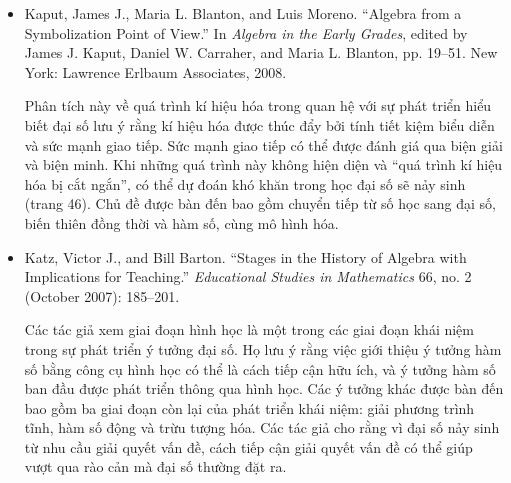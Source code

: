 {{\begin{itemize}
          \par\noindent\hspace*{1em} Saul xác định ba cấp độ trong việc học đại số: khái quát hóa số học, chú ý đến phép toán hai ngôi, và nhận diện dạng đại số, trong đó học sinh có thể quan niệm biến là đại diện cho các biểu thức đại số phức tạp. Học sinh có sự hiểu chưa đầy đủ sẽ bám vào quy tắc ghi nhớ. Việc loại bỏ khả năng thử và sai có thể buộc học sinh tập trung vào các phép toán liên quan trong bài toán đại số và đưa các em từ cấp độ thứ nhất của sự hiểu sang cấp độ thứ hai.\vspace{1.35\baselineskip}
        
        \item Kaput, James J., Maria L. Blanton, and Luis Moreno. ``Algebra from a Symbolization Point of View.'' In \emph{Algebra in the Early Grades}, edited by James J. Kaput, Daniel W. Carraher, and Maria L. Blanton, pp. 19--51. New York: Lawrence Erlbaum Associates, 2008.\vspace{.25\baselineskip}

          \par\noindent\hspace*{1em} Phân tích này về quá trình kí hiệu hóa trong quan hệ với sự phát triển hiểu biết đại số lưu ý rằng kí hiệu hóa được thúc đẩy bởi tính tiết kiệm biểu diễn và sức mạnh giao tiếp. Sức mạnh giao tiếp có thể được đánh giá qua biện giải và biện minh. Khi những quá trình này không hiện diện và ``quá trình kí hiệu hóa bị cắt ngắn'', có thể dự đoán khó khăn trong học đại số sẽ nảy sinh (trang 46). Chủ đề được bàn đến bao gồm chuyển tiếp từ số học sang đại số, biến thiên đồng thời và hàm số, cùng mô hình hóa.\vspace*{1.35\baselineskip}

        \item Katz, Victor J., and Bill Barton. ``Stages in the History of Algebra with Implications for Teaching.'' \emph{Educational Studies in Mathematics} 66, no. 2 (October 2007): 185--201.\vspace{.25\baselineskip}

          \par\noindent\hspace*{1em} Các tác giả xem giai đoạn hình học là một trong các giai đoạn khái niệm trong sự phát triển ý tưởng đại số. Họ lưu ý rằng việc giới thiệu ý tưởng hàm số bằng công cụ hình học có thể là cách tiếp cận hữu ích, và ý tưởng hàm số ban đầu được phát triển thông qua hình học. Các ý tưởng khác được bàn đến bao gồm ba giai đoạn còn lại của phát triển khái niệm: giải phương trình tĩnh, hàm số động và trừu tượng hóa. Các tác giả cho rằng vì đại số nảy sinh từ nhu cầu giải quyết vấn đề, cách tiếp cận giải quyết vấn đề có thể giúp vượt qua rào cản mà đại số thường đặt ra.
      \end{itemize}}
  }{\NOTE{}}

